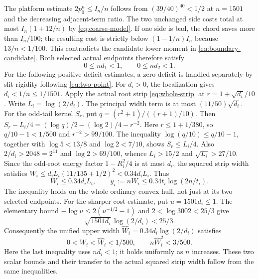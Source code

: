 \documentclass[11pt]{article}
\begin{document}
	The platform estimate $2p_0^n\leq I_n/n$ follows from
	$(39/40)^{40}<1/2$ at $n=1501$ and the decreasing
	adjacent-term ratio.  The two unchanged side costs total at most
	$I_n(1+12/n)$ by \eqref{eq:coarse-model}.  If one side is bad,
	the chord saves more than $I_n/100$; the resulting cost is strictly
	below $(1-1/n)I_n$ because $13/n<1/100$.
	This contradicts the candidate lower moment in
	\eqref{eq:boundary-candidate}.  Both selected actual endpoints
	therefore satisfy
	\[
	0\leq nd_1<1,\qquad 0\leq nd_2<1.
	\]
	For the following positive-deficit estimates, a zero deficit is
	handled separately by slit rigidity following \eqref{eq:two-point}.
	For $d_i>0$, the localization gives $d_i<1/n\leq1/1501$.
	Apply the actual root strip \eqref{eq:whole-strip} at
	$r=1+\sqrt{d_i}/10$.  Write $L_i=\log(2/d_i)$.
	The principal width term is at most $(11/50)\sqrt{d_i}$.
	For the odd-tail kernel $S_r$, put
	$q=(r^2+1)/((r+1)/10)$.  Then
	$S_r-L_i/4=(\log q)/2-(\log2)/4-r^{-2}$.
	Here $r\leq1+1/380$, so $q/10-1<1/500$ and
	$r^{-2}>99/100$.  The inequality
	$\log(q/10)\leq q/10-1$, together with
	$\log5<13/8$ and $\log2<7/10$,
	shows $S_r\leq L_i/4$.
	Also $2/d_i>2048=2^{11}$ and
	$\log2>69/100$, whence $L_i>15/2$ and
	$\sqrt{L_i}>27/10$.  Since the odd-root energy factor
	$1-R_i^2/4$ is at most $d_i$, the squared strip width satisfies
	$W_i\leq d_iL_i(11/135+1/2)^2<0.34d_iL_i$.
	Thus
	\begin{equation}\label{eq:actual-width-034}
		W_i\leq0.34d_iL_i,
		\qquad y_i:=nW_i\leq0.34t_i\log(2n/t_i).
	\end{equation}
	The inequality holds on the whole ordinary convex hull, not just at
	its two selected endpoints.
	For the sharper cost estimate, put $u=1501d_i\leq1$.  The elementary
	bound $-\log u\leq2(u^{-1/2}-1)$ and
	$2<\log3002<25/3$ give
	\[
	\sqrt{1501d_i}\,\log(2/d_i)<25/3.
	\]
	Consequently the unified upper width
	$\widehat W_i=0.34d_i\log(2/d_i)$ satisfies
	\[
	0<W_i<\widehat W_i<1/500,\qquad
	n\widehat W_i^2<3/500.
	\]
	Here the last inequality uses $nd_i<1$; it holds uniformly as
	$n$ increases.  These two scalar bounds and their transfer to the
	actual squared strip width follow from the same inequalities.
	
\end{document}
